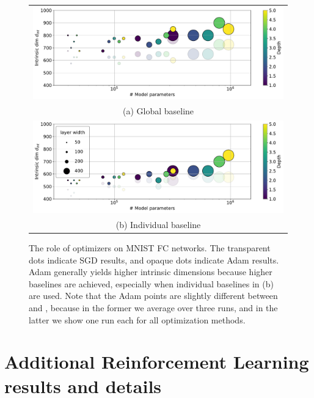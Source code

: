 \documentclass{article} %
\begin{document}
%
\begin{figure}[t!] \centering
	\begin{tabular}{c}
		\hspace{-0mm}
		\includegraphics[width=14.4cm]{optimizer_cmp/fnn_mnist_global_optimizer_cmp}
		\\       
		(a) Global baseline \\
		\hspace{-0mm}
		\includegraphics[width=14.4cm]{optimizer_cmp/fnn_mnist_local_optimizer_cmp}
		\\          
		(b) Individual baseline
	\end{tabular} \vspace{-2mm}
	\caption{The role of optimizers on MNIST FC networks. The transparent dots indicate SGD results, and opaque dots indicate Adam results. Adam generally yields higher intrinsic dimensions because higher baselines are achieved, especially when individual baselines in (b) are used.
Note that the Adam points are slightly different between
 and , 
because in the former we average over three runs, and in the latter we show one run each for all optimization methods.}	

	\label{fig:fnn_mnist_optimizer}
	\vspace{-0mm}
\end{figure}







\section{Additional Reinforcement Learning results and details}
\end{document}
